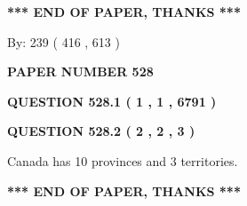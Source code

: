 \documentclass[12pt]{article}
\begin{document}
 
 
 
   
   
 \vspace{0.2in}
 
   
   
   
   
\vspace{1.0in} 
{\textbf{\large{ *** END OF PAPER, THANKS *** }}} 
   
   
\hspace{1.0in} By: 
 239 ( 416 ,  613 )
   
   
   
   
\newpage 
\setcounter{page}{ 
   528001 } 
   
   
   
   
 {\textbf{ \Large{ PAPER NUMBER  528  }}}
   
   
\vspace{0.2in}
   
   
   
   
   
   
 \vspace{0.2in}
 
 
 
 
   
   
  
\vspace{0.2in}
  
{\textbf{\Large{QUESTION
528.1 
 ( 1 , 1 , 6791 )
}}}
  
  
  
\vspace{0.2in}
  
{\textbf{\Large{QUESTION
528.2 
 ( 2 , 2 , 3 )
}}}
  
  
 
 
\noindent{}
 
 
Canada has 10  provinces and 3 territories.
 
 
 
 
   
   
 \vspace{0.2in}
 
   
   
   
   
\vspace{1.0in} 
{\textbf{\large{ *** END OF PAPER, THANKS *** }}} 
   
\end{document}
